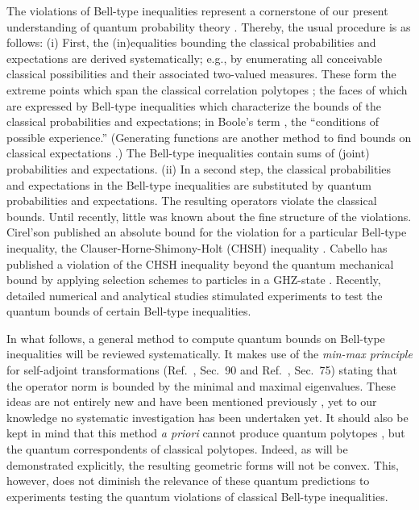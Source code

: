 \documentclass[prl,showpacs,showkeys,amsfonts,amsmath,twocolumn]{revtex4}
\begin{document}
The violations of Bell-type inequalities represent
a cornerstone of our present understanding of quantum probability theory
\cite{peres}.
Thereby, the usual procedure is as follows:
(i)
First, the (in)equalities bounding the classical probabilities and expectations are
derived systematically; e.g., by enumerating all conceivable classical possibilities
and their associated two-valued measures.
These form the extreme points which span
the classical correlation polytopes
\cite{cirelson:80,cirelson,froissart-81,pitowsky-86,pitowsky,pitowsky-89a,Pit-91,Pit-94,2000-poly,collins-gisin-2003,sliwa-2003};
the faces of which are expressed by Bell-type inequalities
which characterize the bounds of the classical probabilities and expectations;
in Boole's term \cite{Boole,Boole-62}, the ``conditions of possible experience.''
(Generating functions are another method to find bounds on classical expectations \cite{werner-wolf-2001,schachner-2003}.)
The Bell-type inequalities contain sums of (joint) probabilities and expectations.
(ii)
In a second step, the classical probabilities and expectations in
the Bell-type inequalities are substituted by quantum probabilities and expectations.
The resulting operators violate the classical bounds.
Until recently, little was known about the fine structure of the violations.
Cirel'son published an absolute bound for the violation for a particular Bell-type inequality,
the Clauser-Horne-Shimony-Holt (CHSH) inequality \cite{cirelson:80,cirelson:87,cirelson,khalfin-97}.
Cabello has published a violation of the CHSH inequality beyond the quantum mechanical
bound by applying selection schemes to particles in a GHZ-state
\cite{cabello-02a,cabello-02b}.
Recently, detailed numerical  \cite{filipp-svo-04-qpoly}
and analytical studies \cite{cabello-2003a} stimulated
experiments \cite{bovino-2003} to test the quantum bounds of certain Bell-type inequalities.

In what follows,
a general method to compute quantum bounds on Bell-type inequalities
will be reviewed systematically.
It makes use of the {\em min-max principle} for self-adjoint transformations
(Ref.~\cite{halmos-vs}, Sec.~90 and  Ref.~\cite{reed-sim4}, Sec.~75)
stating that the operator norm is bounded by the minimal and maximal eigenvalues.
These ideas are not entirely new and have been mentioned previously
\cite{werner-wolf-2001,filipp-svo-04-qpoly,cabello-2003a},
yet to our knowledge no systematic investigation has been undertaken yet.
It should also be kept in mind that this method {\it a priori}
cannot produce quantum polytopes \cite{pit:range-2001,filipp-svo-04-qpoly},
but the quantum correspondents of classical polytopes.
Indeed, as will be demonstrated explicitly, the resulting geometric forms will not be convex.
This, however,
does not diminish the relevance of these quantum predictions
to experiments testing the quantum violations
of classical Bell-type inequalities.
\end{document}
